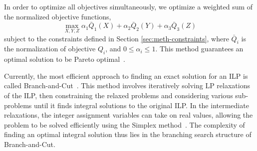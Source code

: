 In order to optimize all objectives simultaneously, we optimize a weighted sum
of the normalized objective functions,
\begin{equation}
\max_{X, Y, Z} \alpha_1 \bar{Q}_1(X) + \alpha_2 \bar{Q}_2(Y) + \alpha_3
\bar{Q}_3(Z)
\end{equation}
subject to the constraints defined in Section \ref{sec:meth-constraints},
where $\bar{Q}_i$ is the normalization of objective $Q_i$, and $0 \leq \alpha_i \leq 1$. 
This method guarantees an optimal solution to be Pareto optimal~\cite{stanimirovic_linear_2011}. 

Currently, the most efficient approach to finding an exact solution for 
an ILP is called Branch-and-Cut~\cite{mitchell_branch-and-cut_2002}.   %
This method involves iteratively solving 
LP relaxations of the ILP, then constraining the relaxed problems and
considering various sub-problems until it finds integral solutions to the 
original ILP.
In the intermediate relaxations, the integer assignment variables can
take on real values, allowing the problem to be solved efficiently using 
the Simplex method~\cite{shamir_efficiency_1987}. The 
complexity of finding an optimal integral solution thus lies in the 
branching search structure of Branch-and-Cut.


